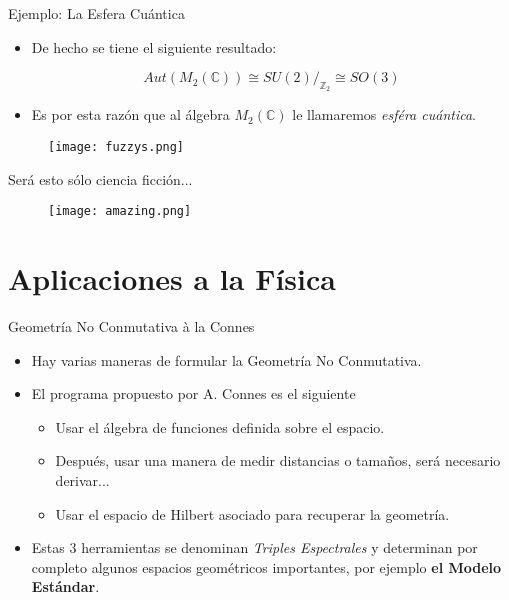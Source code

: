 \documentclass{beamer}
\begin{document}
\begin{frame}{Ejemplo: La Esfera Cuántica}

\begin{itemize}

\vspace{5mm}
\item De hecho se tiene el siguiente resultado:

\[
Aut(M_2 (\mathbb{C})) \cong SU(2)/_{\mathbb{Z}_2} \cong SO(3)
\]
\vspace{2mm}

\item Es por esta razón que al álgebra $M_2(\mathbb{C})$ le llamaremos \textit{esféra cuántica}.
\end{itemize}

\begin{figure}
\texttt{[image: fuzzys.png]}
\end{figure}
\end{frame}
\begin{frame}{Será esto sólo ciencia ficción...}
\begin{figure}
\texttt{[image: amazing.png]}
\end{figure}
\end{frame}

\section{Aplicaciones a la Física}

\begin{frame}{Geometría No Conmutativa à la Connes}

\begin{itemize}
\item Hay varias maneras de formular la Geometría No Conmutativa.
\vspace{5mm}
\item El programa propuesto por A. Connes es el siguiente
 \begin{itemize}
 \item Usar el álgebra de funciones definida sobre el espacio.
 \item Después, usar una manera de medir distancias o tamaños, será necesario derivar...
 \item Usar el espacio de Hilbert asociado para recuperar la geometría.
 \end{itemize} 

\vspace{5mm}
\item Estas 3 herramientas se denominan \textit{Triples Espectrales} y determinan por completo algunos espacios geométricos importantes, por ejemplo {\bf{el Modelo Estándar}}. 

\end{itemize}
\end{frame}
\end{document}
